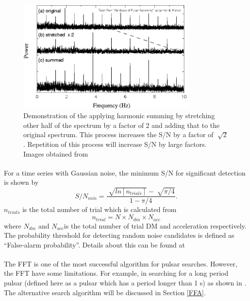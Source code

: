 \documentclass[thesis_msc.tex]{subfiles}
\begin{document}
 \begin{figure}[h]
\centering
\includegraphics[width=0.8\textwidth]{figures/6_06.png}
\caption{Demonstration of the applying harmonic summing by stretching other half of the spectrum by a factor of 2 and adding that to the original spectrum. This process increases the S/N by a factor of $\sqrt[]{2}$. Repetition of this process will increase S/N by large factors. Images obtained from \citep{handbook}}
\label{FFT_ham}
\end{figure}
        \paragraph{} For a time series with Gaussian noise, the minimum S/N for significant detection is shown by
        \begin{equation}
        S/N_{min}=\frac{\sqrt[]{ln[n_{trials}]}-\sqrt[]{\pi/4}}{1-\pi/4}.
        \end{equation}
		$n_{trials}$ is the total number of trial which is calculated from 
        \begin{equation} \label{n_trial}
        n_{trial}=N \times N_{dm} \times N_{acc}
        \end{equation}
 where $N_{dm}$  and $N_{acc}$is the total number of trial DM and acceleration respectively. The probability threshold for detecting random noise candidates is defined as ``False-alarm probability''. Details about this can be found at \cite{handbook}
\paragraph{} The FFT is one of the most successful algorithm for pulsar searches. However, the FFT have some limitations. For example, in searching for a long period pulsar (defined here as a pulsar which has a period longer than 1 s) as shown in  \cite{kondratiev2009new}. The alternative search algorithm will be discussed in Section \ref{FFA}. 
\end{document}
